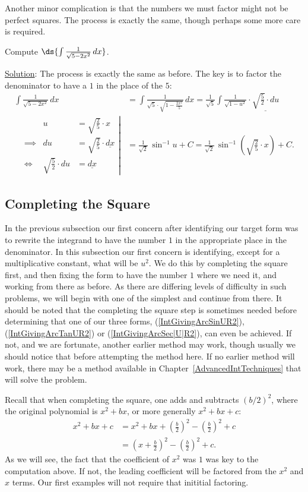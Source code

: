 Another minor complication is that the numbers we must factor might
not be perfect squares.  The process is exactly the same,
though perhaps some more care is required.

\bex Compute $\ds{\int\frac1{\sqrt{5-2x^2}}\,dx}$.

\underline{Solution}: The process is exactly the same as before.
The key is to factor the denominator to have a $1$ in the place
of the $5$:
\begin{align*}
\int\frac1{\sqrt{5-2x^2}}\,dx
&=\int\frac1{\sqrt{5}\cdot\sqrt{1-\frac{2x^2}5}}\,dx
 =\frac1{\sqrt{5}}\int\frac1{\sqrt{1-u^2}}
     \cdot\underline{\sqrt{\frac52}\cdot du}\\
\left.\begin{alignedat}{2}
&&u&=\sqrt{\frac25}\cdot x\\
&\implies&du&=\sqrt{\frac25}\cdot\underline{dx}\\
&\iff&\sqrt{\frac52}\cdot du&=\underline{dx}
\end{alignedat}\right|
&=\frac{1}{\sqrt2}\,\sin^{-1}u+C
 =\frac1{\sqrt2}\,\sin^{-1}\left(\sqrt{\frac25}\cdot x\right)+C.
\end{align*}

\eex

\subsection{Completing the Square}
In the previous subsection our first concern after identifying our
target form was to rewrite the integrand to have the number $1$
in the appropriate place in the denominator.  In this subsection
our first concern is identifying, except for a multiplicative
constant, what will be $u^2$.  We do this by completing the 
square first, and then fixing the form to have the number
$1$ where we need it, and working from there as before.
As there are differing levels of difficulty in such problems,
we will begin with one of the simplest and continue from there.
It should be noted that the completing the square step is
sometimes needed before determining that one of our three forms,
(\ref{IntGivingArcSinUR2}), 
(\ref{IntGivingArcTanUR2}) or (\ref{IntGivingArcSec|U|R2}),
can even be achieved.  If not, and we are fortunate, another
earlier method may work, though usually we should notice that
before attempting the method here.  If no earlier method will work,
there may be a method available in Chapter~\ref{AdvancedIntTechniques} 
that will solve the problem.

Recall that when completing the square, one adds and subtracts
$(b/2)^2$, where the original polynomial is $x^2+bx$, or 
more generally $x^2+bx+c$:
\begin{align*}
x^2+bx+c&=x^2+bx+\left(\frac{b}2\right)^2-\left(\frac{b}2\right)^2+c\\
&=\left(x+\frac{b}2\right)^2-\left(\frac{b}2\right)^2+c.\end{align*}
As we will see, the fact that the coefficient of $x^2$ was $1$
was key to the computation above.  If not, the leading coefficient 
will be factored from the $x^2$ and $x$ terms. Our first 
examples will not require that inititial factoring.


